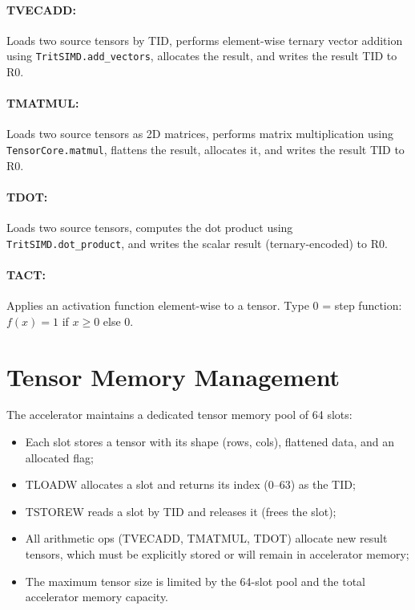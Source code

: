 \documentclass[10pt,a4paper,twoside]{book}
\begin{document}
\paragraph{TVECADD:} Loads two source tensors by TID, performs element-wise ternary
vector addition using \texttt{TritSIMD.add\_vectors}, allocates the result, and
writes the result TID to R0.

\paragraph{TMATMUL:} Loads two source tensors as 2D matrices, performs matrix
multiplication using \texttt{TensorCore.matmul}, flattens the result, allocates it,
and writes the result TID to R0.

\paragraph{TDOT:} Loads two source tensors, computes the dot product using
\texttt{TritSIMD.dot\_product}, and writes the scalar result (ternary-encoded) to R0.

\paragraph{TACT:} Applies an activation function element-wise to a tensor.
Type 0 = step function: $f(x) = 1$ if $x \ge 0$ else $0$.

\section{Tensor Memory Management}

The accelerator maintains a dedicated tensor memory pool of 64 slots:
\begin{itemize}
    \item Each slot stores a tensor with its shape (rows, cols), flattened data, and
          an allocated flag;
    \item TLOADW allocates a slot and returns its index (0--63) as the TID;
    \item TSTOREW reads a slot by TID and releases it (frees the slot);
    \item All arithmetic ops (TVECADD, TMATMUL, TDOT) allocate new result tensors,
          which must be explicitly stored or will remain in accelerator memory;
    \item The maximum tensor size is limited by the 64-slot pool and the total
          accelerator memory capacity.
\end{itemize}
\end{document}
